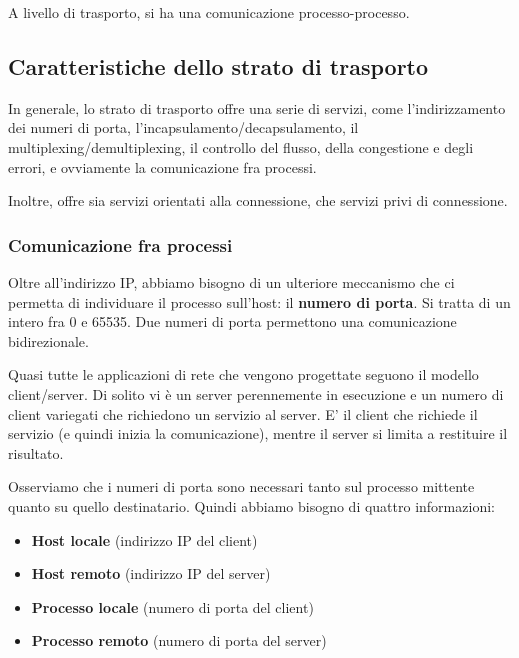     A livello di trasporto, si ha una comunicazione processo-processo.
   
    \subsection{Caratteristiche dello strato di trasporto}
   
    In generale, lo strato di trasporto offre una serie di servizi, come l'indirizzamento dei numeri di porta, l'incapsulamento/decapsulamento, il multiplexing/demultiplexing, il controllo del flusso, della congestione e degli errori, e ovviamente la comunicazione fra processi. 
    
    Inoltre, offre sia servizi orientati alla connessione, che servizi privi di connessione.
   
        \subsubsection{Comunicazione fra processi}
       
            Oltre all'indirizzo IP, abbiamo bisogno di un ulteriore meccanismo che ci permetta di individuare il processo sull'host: il \textbf{numero di porta}. Si tratta di un intero fra 0 e 65535. Due numeri di porta permettono una comunicazione bidirezionale.
           
            \vspace{3mm}
           
            Quasi tutte le applicazioni di rete che vengono progettate seguono il modello client/server. Di solito vi è un server perennemente in esecuzione e un numero di client variegati che richiedono un servizio al server. E' il client che richiede il servizio (e quindi inizia la comunicazione), mentre il server si limita a restituire il risultato.
           
            Osserviamo che i numeri di porta sono necessari tanto sul processo mittente quanto su quello destinatario. Quindi abbiamo bisogno di quattro informazioni:
           
            \begin{itemize}
                \item 
                    \textbf{Host locale} (indirizzo IP del client)
                    
                \item
                    \textbf{Host remoto} (indirizzo IP del server)
                    
                \item
                    \textbf{Processo locale} (numero di porta del client)
                    
                \item
                    \textbf{Processo remoto} (numero di porta del server)
            \end{itemize}
        
